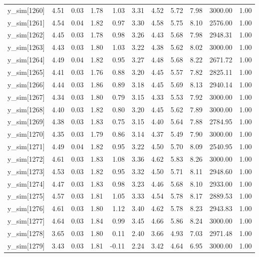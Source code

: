\begin{table}[ht]
\begin{tabular}{rrrrrrrrrrr}
  y\_sim[1260] & 4.51 & 0.03 & 1.78 & 1.03 & 3.31 & 4.52 & 5.72 & 7.98 & 3000.00 & 1.00 \\ 
  y\_sim[1261] & 4.54 & 0.04 & 1.82 & 0.97 & 3.30 & 4.58 & 5.75 & 8.10 & 2576.00 & 1.00 \\ 
  y\_sim[1262] & 4.45 & 0.03 & 1.78 & 0.98 & 3.26 & 4.43 & 5.68 & 7.98 & 2948.31 & 1.00 \\ 
  y\_sim[1263] & 4.43 & 0.03 & 1.80 & 1.03 & 3.22 & 4.38 & 5.62 & 8.02 & 3000.00 & 1.00 \\ 
  y\_sim[1264] & 4.49 & 0.04 & 1.82 & 0.95 & 3.27 & 4.48 & 5.68 & 8.22 & 2671.72 & 1.00 \\ 
  y\_sim[1265] & 4.41 & 0.03 & 1.76 & 0.88 & 3.20 & 4.45 & 5.57 & 7.82 & 2825.11 & 1.00 \\ 
  y\_sim[1266] & 4.44 & 0.03 & 1.86 & 0.89 & 3.18 & 4.45 & 5.69 & 8.13 & 2940.14 & 1.00 \\ 
  y\_sim[1267] & 4.34 & 0.03 & 1.80 & 0.79 & 3.15 & 4.33 & 5.53 & 7.92 & 3000.00 & 1.00 \\ 
  y\_sim[1268] & 4.40 & 0.03 & 1.82 & 0.80 & 3.20 & 4.45 & 5.62 & 7.89 & 3000.00 & 1.00 \\ 
  y\_sim[1269] & 4.38 & 0.03 & 1.83 & 0.75 & 3.15 & 4.40 & 5.64 & 7.88 & 2784.95 & 1.00 \\ 
  y\_sim[1270] & 4.35 & 0.03 & 1.79 & 0.86 & 3.14 & 4.37 & 5.49 & 7.90 & 3000.00 & 1.00 \\ 
  y\_sim[1271] & 4.49 & 0.04 & 1.82 & 0.95 & 3.22 & 4.50 & 5.70 & 8.09 & 2540.95 & 1.00 \\ 
  y\_sim[1272] & 4.61 & 0.03 & 1.83 & 1.08 & 3.36 & 4.62 & 5.83 & 8.26 & 3000.00 & 1.00 \\ 
  y\_sim[1273] & 4.53 & 0.03 & 1.82 & 0.95 & 3.32 & 4.50 & 5.71 & 8.11 & 2948.60 & 1.00 \\ 
  y\_sim[1274] & 4.47 & 0.03 & 1.83 & 0.98 & 3.23 & 4.46 & 5.68 & 8.10 & 2933.00 & 1.00 \\ 
  y\_sim[1275] & 4.57 & 0.03 & 1.81 & 1.05 & 3.33 & 4.54 & 5.78 & 8.17 & 2889.53 & 1.00 \\ 
  y\_sim[1276] & 4.61 & 0.03 & 1.80 & 1.12 & 3.40 & 4.62 & 5.78 & 8.23 & 2943.83 & 1.00 \\ 
  y\_sim[1277] & 4.64 & 0.03 & 1.84 & 0.99 & 3.45 & 4.66 & 5.86 & 8.24 & 3000.00 & 1.00 \\ 
  y\_sim[1278] & 3.65 & 0.03 & 1.80 & 0.11 & 2.40 & 3.66 & 4.93 & 7.03 & 2971.48 & 1.00 \\ 
  y\_sim[1279] & 3.43 & 0.03 & 1.81 & -0.11 & 2.24 & 3.42 & 4.64 & 6.95 & 3000.00 & 1.00 \\ 

\end{tabular}
\end{table}
